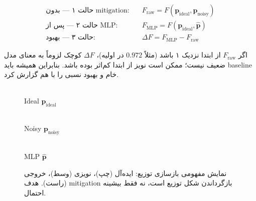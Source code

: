 \begin{align}
\text{حالت ۱ — بدون mitigation:}\quad
& F_{\mathrm{raw}} = F(\mathbf{p}_{\mathrm{ideal}}, \mathbf{p}_{\mathrm{noisy}})
\label{eq:f-raw}\\
\text{حالت ۲ — پس از MLP:}\quad
& F_{\mathrm{MLP}} = F(\mathbf{p}_{\mathrm{ideal}}, \hat{\mathbf{p}})
\label{eq:f-mlp}\\
\text{حالت ۳ — بهبود:}\quad
& \Delta F = F_{\mathrm{MLP}} - F_{\mathrm{raw}}
\label{eq:delta-f}
\end{align}

اگر $F_{\mathrm{raw}}$ از ابتدا نزدیک ۱ باشد (مثلاً $0.972$ در  اولیه)، $\Delta F$ کوچک لزوماً به معنای مدل ضعیف نیست؛ ممکن است نویز از ابتدا کم‌اثر بوده باشد. بنابراین همیشه باید baseline خام و بهبود نسبی را با هم گزارش کرد.

\begin{figure}[htbp]
\centering
\begin{minipage}{0.32\textwidth}
\centering
{}\\
\small Ideal $\mathbf{p}_{\mathrm{ideal}}$
\end{minipage}\hfill
\begin{minipage}{0.32\textwidth}
\centering
{}\\
\small Noisy $\mathbf{p}_{\mathrm{noisy}}$
\end{minipage}\hfill
\begin{minipage}{0.32\textwidth}
\centering
{}\\
\small MLP $\hat{\mathbf{p}}$
\end{minipage}
\caption{نمایش مفهومی بازسازی توزیع: ایده‌آل (چپ)، نویزی (وسط)، خروجی  (راست). هدف mitigation بازگرداندن شکل توزیع است، نه فقط بیشینه احتمال.}
\label{fig:dist-reconstruction}
\end{figure}

